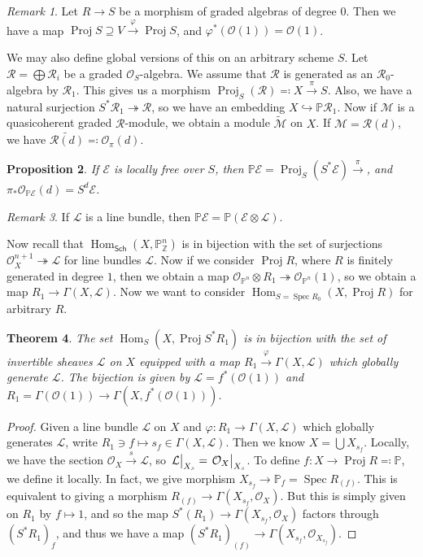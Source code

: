 \documentclass[leqno, openany]{memoir}
\newtheorem{thm}{Theorem}[section]
\newtheorem{prop}[thm]{Proposition}
\theoremstyle{definition}
\theoremstyle{remark}
\newtheorem{rmk}[thm]{Remark}
\theoremstyle{plain}
\theoremstyle{definition}
\theoremstyle{remark}
\newcommand{\Z}{\mathbb{Z}}
\renewcommand{\P}{\mathbb{P}}
\newcommand{\mc}[1]{\mathcal{#1}}
\newcommand{\ms}[1]{\mathsf{#1}}
\newcommand{\wt}[1]{\widetilde{#1}}
\DeclareMathOperator{\Hom}{Hom}
\DeclareMathOperator{\Spec}{Spec}
\DeclareMathOperator{\Proj}{Proj}
\begin{document}
\begin{rmk} Let $R \to S$ be a morphism of graded algebras of degree $0$. Then
we have a map $\Proj S \supseteq V \xrightarrow{\varphi} \Proj S$, and
$\varphi^*(\mc{O}(1)) = \mc{O}(1)$.  \end{rmk}

We may also define global versions of this on an arbitrary scheme $S$. Let
$\mc{R} = \bigoplus \mc{R}_i$ be a graded $\mc{O}_S$-algebra. We assume that
$\mc{R}$ is generated as an $\mc{R}_0$-algebra by $\mc{R}_1$. This gives us a
morphism $\Proj_S(\mc{R}) \eqqcolon X \xrightarrow{\pi} S$. Also, we have a
natural surjection $S^* \mc{R}_1 \twoheadrightarrow \mc{R}$, so we have an
embedding $X \hookrightarrow \P \mc{R}_1$. Now if $\mc{M}$ is a quasicoherent
graded $\mc{R}$-module, we obtain a module $\wt{\mc{M}}$ on $X$. If $\mc{M} =
\mc{R}(d)$, we have $\wt{\mc{R}(d)} \eqqcolon \mc{O}_{\pi}(d)$.

\begin{prop} If $\mc{E}$ is locally free over $S$, then $\P \mc{E} =
\Proj_S(S^* \mc{E}) \xrightarrow{\pi}$, and $\pi_* \mc{O}_{\P \mc{E}}(d) = S^d
\mc{E}$.  \end{prop}

\begin{rmk} If $\mc{L}$ is a line bundle, then $\P \mc{E} = \P (\mc{E} \otimes
\mc{L})$.  \end{rmk}

Now recall that $\Hom_{\ms{Sch}}(X, \P^n_{\Z})$ is in bijection with the set of
surjections $\mc{O}_X^{n+1} \twoheadrightarrow \mc{L}$ for line bundles
$\mc{L}$. Now if we consider $\Proj R$, where $R$ is finitely generated in
degree $1$, then we obtain a map $\mc{O}_{\P^n} \otimes R_1 \twoheadrightarrow
\mc{O}_{\P^n}(1)$, so we obtain a map $R_1 \to \Gamma(X, \mc{L})$. Now we want
to consider $\Hom_{S = \Spec R_0}(X, \Proj R)$ for arbitrary $R$.

\begin{thm} The set $\Hom_S(X, \Proj S^* R_1)$ is in bijection with the set of
    invertible sheaves $\mc{L}$ on $X$ equipped with a map $R_1
    \xrightarrow{\varphi} \Gamma(X, \mc{L})$ which globally generate $\mc{L}$.
    The bijection is given by $\mc{L} = f^*(\mc{O}(1))$ and $R_1 =
    \Gamma(\mc{O}(1)) \to \Gamma(X, f^*(\mc{O}(1)))$.  \end{thm}

\begin{proof} Given a line bundle $\mc{L}$ on $X$ and $\varphi \colon R_1 \to
    \Gamma(X, \mc{L})$ which globally generates $\mc{L}$, write $R_1 \ni f
    \mapsto s_f \in \Gamma(X, \mc{L})$. Then we know $X = \bigcup X_{s_f}$.
    Locally, we have the section $\mc{O}_X \xrightarrow{s} \mc{L}$, so
    $\eval{\mc{L}}_{X_s} = \eval{\mc{O}_X}_{X_s}$. To define $f \colon X \to
    \Proj R \eqqcolon \P$, we define it locally. In fact, we give morphism
    $X_{s_f} \to \P_f = \Spec R_{(f)}$. This is equivalent to giving a morphism
    $R_{(f)} \to \Gamma(X_{s_f}, \mc{O}_X)$. But this is simply given on $R_1$
    by $f \mapsto 1$, and so the map $S^*(R_1) \to \Gamma(X_{s_f}, \mc{O}_X)$
    factors through ${(S^* R_1)}_f$, and thus we have a map ${(S^* R_1)}_{(f)}
    \to \Gamma(X_{s_f}, \mc{O}_{X_{s_f}})$.  \end{proof}
\end{document}
